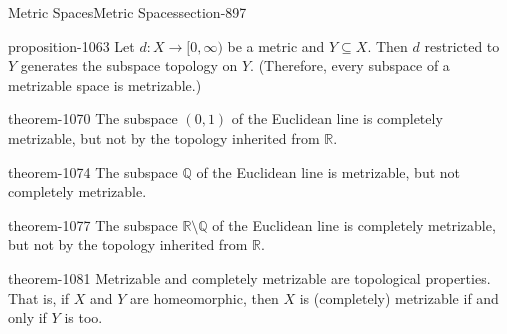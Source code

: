 \documentclass[oneside,10pt,]{article}
\newcommand{\mb}{\mathbb}
\begin{document}
\begin{sectionptx}{Metric Spaces}{}{Metric Spaces}{}{}{section-897}
\begin{proposition}{}{}{proposition-1063}
\hypertarget{p-1064}{}%
Let \(d:X\to[0,\infty)\) be a metric and \(Y\subseteq X\). Then \(d\) restricted to \(Y\) generates the subspace topology on \(Y\). (Therefore, every subspace of a metrizable space is metrizable.)%
\end{proposition}
\begin{theorem}{}{}{theorem-1070}%
\hypertarget{p-1071}{}%
The subspace \((0,1)\) of the Euclidean line is completely metrizable, but not by the topology inherited from \(\mb R\).%
\end{theorem}
\begin{theorem}{}{}{theorem-1074}%
\hypertarget{p-1075}{}%
The subspace \(\mb Q\) of the Euclidean line is metrizable, but not completely metrizable.%
\end{theorem}
\begin{theorem}{}{}{theorem-1077}%
\hypertarget{p-1078}{}%
The subspace \(\mb R\setminus\mb Q\) of the Euclidean line is completely metrizable, but not by the topology inherited from \(\mb R\).%
\end{theorem}
\begin{theorem}{}{}{theorem-1081}%
\hypertarget{p-1082}{}%
Metrizable and completely metrizable are topological properties. That is, if \(X\) and \(Y\) are homeomorphic, then \(X\) is (completely) metrizable if and only if \(Y\) is too.%
\end{theorem}
\end{sectionptx}
%
%
\typeout{************************************************}
\typeout{************************************************}
%
\end{document}
